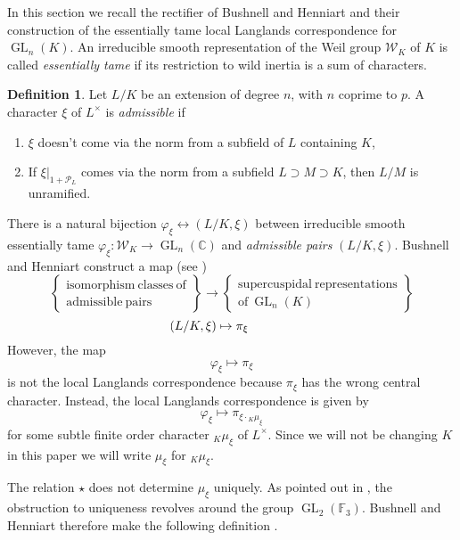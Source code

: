\documentclass{compositio}
\theoremstyle{plain}
\theoremstyle{definition}
\newtheorem{definition}[theorem]{Definition}
\DeclareMathOperator{\GL}{GL}
\newcommand{\PL}{\mathcal{P}_L}
\newcommand{\Lx}{L^\times}
\newcommand{\Weil}{\mathcal{W}}
\begin{document}
In this section we recall the rectifier of Bushnell and Henniart and their construction of the
essentially tame local Langlands correspondence for $\GL_{n}(K)$.
An irreducible smooth representation of the Weil group $\Weil_K$ of $K$ is
called \emph{essentially tame} if its restriction to wild inertia is a
sum of characters.
\begin{definition}\label{admissiblepairhowe}
Let $L/K$ be an extension of degree $n$, with $n$ coprime to $p$.  A character
$\xi$ of $L^\times$ is \emph{admissible} if
\begin{enumerate}
\item $\xi$ doesn't come via the norm from a subfield of $L$ containing $K$,
\item If $\xi|_{1 + \PL}$ comes via the norm from a subfield $L \supset M \supset K$, then
$L/M$ is unramified.
\end{enumerate}
\end{definition}
There is a natural bijection
$\varphi_{\xi} \leftrightarrow (L/K, \xi)$ between irreducible smooth essentially tame
$\varphi_{\xi} : \Weil_K \rightarrow \GL_{n}(\mathbb{C})$ and
\emph{admissible pairs} $(L/K, \xi)$.
Bushnell and Henniart
construct a map (see \cite{bushnell-henniart:10a})
\begin{equation*}
\left\{
\begin{array}{cc}
\mathrm{isomorphism \ classes \ of} \\
\mathrm{admissible \ pairs}
\end{array}
\right\} \rightarrow \left\{
\begin{array}{cc}
\mathrm{supercuspidal \ representations} \\
\mathrm{of} \ \GL_{n}(K)
\end{array} \right\}
\end{equation*}
$$\hspace{-.5in} (L/K, \xi) \mapsto \pi_{\xi}$$
However, the map $$\varphi_{\xi} \mapsto \pi_{\xi}$$
is not the local Langlands
correspondence because $\pi_{\xi}$ has the wrong central character.
Instead, the local Langlands correspondence is given by
\begin{equation}\label{llcgln}
\varphi_{\xi} \mapsto \pi_{\xi \cdot {}_K \mu_{\xi}} \tag{$\star$}
\end{equation}
for some subtle finite order
character ${}_K \mu_{\xi}$ of $\Lx$.  Since we will not be changing $K$
in this paper we will write $\mu_\xi$ for ${}_K \mu_{\xi}$.

The relation $\star$ does not determine $\mu_{\xi}$ uniquely.  As pointed out
in \cite{bushnell-henniart:10a}, the obstruction to uniqueness revolves around the
group $\GL_2(\mathbb{F}_3)$.  Bushnell and Henniart therefore make the following definition \cite[Def. 1]{bushnell-henniart:10a}.
\end{document}

